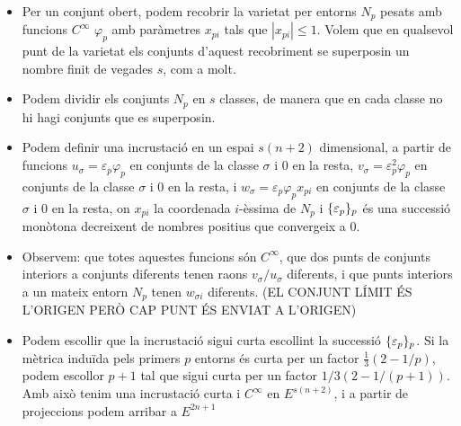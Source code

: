 {\begin{itemize}
    \item Per un conjunt obert, podem recobrir la varietat per entorns $N_p$ pesats amb funcions $C^\infty$ $\varphi_p$ amb paràmetres $x_{pi}$ tals que $|x_{pi}|\le1$. Volem que en qualsevol punt de la varietat els conjunts d'aquest recobriment se superposin un nombre finit de vegades $s$, com a molt.
    \item Podem dividir els conjunts $N_p$ en $s$ classes, de manera que en cada classe no hi hagi conjunts que es superposin. 
    \item Podem definir una incrustació en un espai $s(n+2)$ dimensional, a partir de funcions $u_\sigma=\varepsilon_p\varphi_p$ en conjunts de la classe $\sigma$ i $0$ en la resta, $v_\sigma=\varepsilon^2_p\varphi_p$ en conjunts de la classe $\sigma$ i $0$ en la resta, i $w_\sigma=\varepsilon_p\varphi_px_{pi}$ en conjunts de la classe $\sigma$ i $0$ en la resta, on $x_{pi}$ la coordenada $i$-èssima de $N_p$ i $\{\varepsilon_p\}_p$ és una successió monòtona decreixent de nombres positius que convergeix a $0$.
    \item Observem: que totes aquestes funcions són $C^\infty$, que dos punts de conjunts interiors a conjunts diferents tenen raons $v_\sigma/u_\sigma$ diferents, i que punts interiors a un mateix entorn $N_p$ tenen $w_{\sigma i}$ diferents. (EL CONJUNT LÍMIT ÉS L'ORIGEN PERÒ CAP PUNT ÉS ENVIAT A L'ORIGEN)
    \item Podem escollir que la incrustació sigui curta escollint la successió $\{\varepsilon_p\}_p$. Si la mètrica induïda pels primers $p$ entorns és curta per un factor $\frac13(2-1/p)$, podem escollor $p+1$ tal que sigui curta per un factor $1/3(2-1/(p+1))$. Amb això tenim una incrustació curta i $C^\infty$ en $E^{s(n+2)}$, i a partir de projeccions podem arribar a $E^{2n+1}$


\end{itemize}

}









